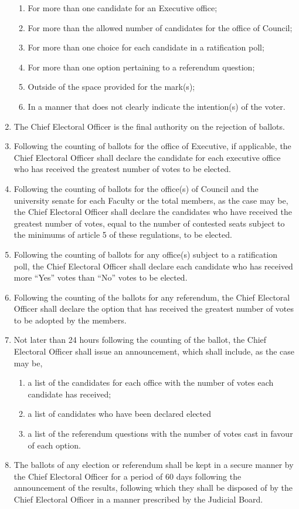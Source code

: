 \documentclass[oneside]{book}
\begin{document}
\begin{enumerate}
\begin{enumerate}
\item For more than one candidate for an Executive office; 
\item For more than the allowed number of candidates for the office of Council; 
\item For more than one choice for each candidate in a ratification poll; 
\item For more than one option pertaining to a referendum question; 
\item Outside of the space provided for the mark(s); 
\item In a manner that does not clearly indicate the intention(s) of the
voter. 
\end{enumerate}
\item The Chief Electoral Officer is the final authority on the rejection
of ballots. 
\item Following the counting of ballots for the office of Executive, if
applicable, the Chief Electoral Officer shall declare the candidate
for each executive office who has received the greatest number of
votes to be elected. 
\item Following the counting of ballots for the office(s) of Council and
the university senate for each Faculty or the total members, as the
case may be, the Chief Electoral Officer shall declare the candidates
who have received the greatest number of votes, equal to the number
of contested seats subject to the minimums of article 5 of these regulations,
to be elected. 
\item Following the counting of ballots for any office(s) subject to a ratification
poll, the Chief Electoral Officer shall declare each candidate who
has received more ``Yes'' votes than ``No''
votes to be elected. 
\item Following the counting of the ballots for any referendum, the Chief
Electoral Officer shall declare the option that has received the greatest
number of votes to be adopted by the members. 
\item \label{announcement-of-results}Not later than 24 hours following
the counting of the ballot, the Chief Electoral Officer shall issue
an announcement, which shall include, as the case may be, 

\begin{enumerate}
\item a list of the candidates for each office with the number of votes
each candidate has received; 
\item a list of candidates who have been declared elected 
\item a list of the referendum questions with the number of votes cast in
favour of each option. 
\end{enumerate}
\item The ballots of any election or referendum shall be kept in a secure
manner by the Chief Electoral Officer for a period of 60 days following
the announcement of the results, following which they shall be disposed
of by the Chief Electoral Officer in a manner prescribed by the Judicial
Board. 


\end{enumerate}
\end{document}
